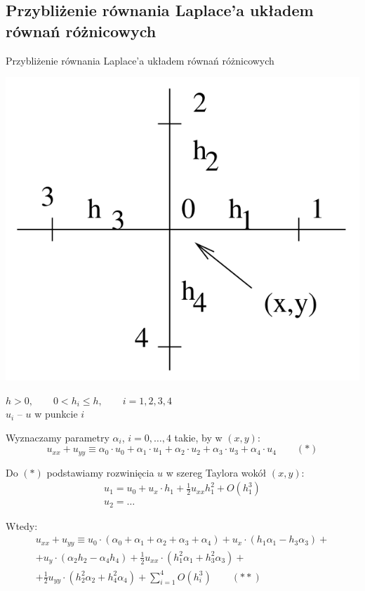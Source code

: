 \subsection{Przybliżenie równania Laplace'a układem równań różnicowych}


\begin{frame}{\large{Przybliżenie równania Laplace'a układem równań różnicowych}} %
  \centerline{\includegraphics[width = 0.5 \linewidth]{img/23/przyblizanie}}
  $h>0, \qquad 0<h_i \le h, \qquad i = 1,2,3,4$ \\
  $u_i$  -- $u$ w punkcie $i$
\end{frame}

\begin{frame}
  Wyznaczamy parametry $\alpha_i$, $i=0, \dots ,4$ takie, by w $(x,y)$:
  $$u_{xx} + u_{yy} \equiv \alpha_0 \cdot u_0 + \alpha_1 \cdot u_1 + \alpha_2 \cdot u_2 + \alpha_3 \cdot u_3 + \alpha_4 \cdot u_4 \qquad (*)$$

  Do $(*)$ podstawiamy rozwinięcia $u$ w szereg Taylora wokół $(x,y)$:
  $$ \begin{array}{l}
    u_1 = u_0 + u_x \cdot h_1 + \frac{1}{2} u_{x x} h_1^2 + O(h_1^3) \\
    u_2 = \ldots
  \end{array} $$

  Wtedy:
  \begin{multline*}
    u_{x x} + u_{y y} \equiv u_0 \cdot (\alpha_0 + \alpha_1 + \alpha_2 + \alpha_3 + \alpha_4) + u_x \cdot (h_1 \alpha_1 - h_3 \alpha_3) + \\
    + u_y \cdot (\alpha_2 h_2 - \alpha_4 h_4) + \frac{1}{2} u_{x x} \cdot (h_1^2 \alpha_1 + h_3^2 \alpha_3) + \\
    + \frac{1}{2} u_{y y} \cdot (h_2^2 \alpha_2 + h_4^2 \alpha_4) + \sum_{i=1}^4 O(h_i^3) \qquad (**)
  \end{multline*}
\end{frame}

